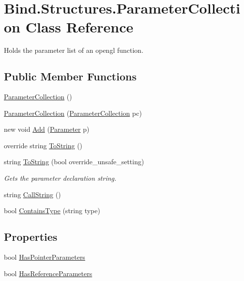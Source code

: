 \hypertarget{class_bind_1_1_structures_1_1_parameter_collection}{
\section{Bind.Structures.ParameterCollection Class Reference}
\label{class_bind_1_1_structures_1_1_parameter_collection}
}


Holds the parameter list of an opengl function.  


\subsection*{Public Member Functions}
\begin{DoxyCompactItemize}
\item 
\hyperlink{class_bind_1_1_structures_1_1_parameter_collection_a23949cee985d0b6f4ba2b24999e6919b}{ParameterCollection} ()
\item 
\hyperlink{class_bind_1_1_structures_1_1_parameter_collection_a867dfe4e1d40268818ac47524adbc0a7}{ParameterCollection} (\hyperlink{class_bind_1_1_structures_1_1_parameter_collection}{ParameterCollection} pc)
\item 
new void \hyperlink{class_bind_1_1_structures_1_1_parameter_collection_afca4cb1bc696bfc3d9d75a567135df7b}{Add} (\hyperlink{class_bind_1_1_structures_1_1_parameter}{Parameter} p)
\item 
override string \hyperlink{class_bind_1_1_structures_1_1_parameter_collection_a67bd51f5cb180bd65fd4047d08efe13f}{ToString} ()
\item 
string \hyperlink{class_bind_1_1_structures_1_1_parameter_collection_a265f62c21101c2e9ebae5f30f0044c6b}{ToString} (bool override\_\-unsafe\_\-setting)
\begin{DoxyCompactList}\small\item\em Gets the parameter declaration string. \item\end{DoxyCompactList}\item 
string \hyperlink{class_bind_1_1_structures_1_1_parameter_collection_a09de6c96e12d161ddb81204d04196a05}{CallString} ()
\item 
bool \hyperlink{class_bind_1_1_structures_1_1_parameter_collection_a5e6b5d6310057a0b32cd5689b8eb0116}{ContainsType} (string type)
\end{DoxyCompactItemize}
\subsection*{Properties}
\begin{DoxyCompactItemize}
\item 
bool \hyperlink{class_bind_1_1_structures_1_1_parameter_collection_a7f29ba27c46fe4dcd76dd7ef4d8390a1}{HasPointerParameters}
\item 
bool \hyperlink{class_bind_1_1_structures_1_1_parameter_collection_aeb29ae39d1533fa59225bd1834d175b3}{HasReferenceParameters}
\end{DoxyCompactItemize}


